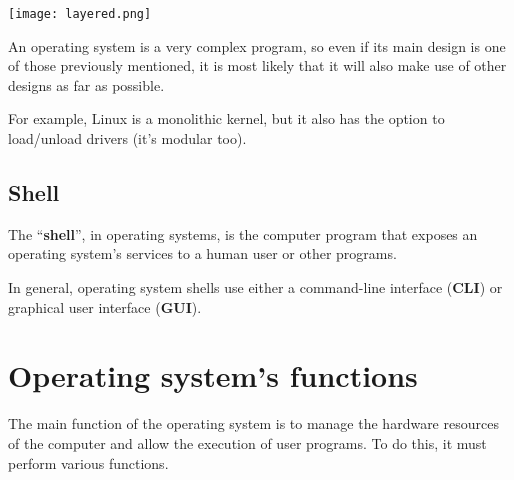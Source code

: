 \begin{itemize}
    \begin{center}
        \texttt{[image: layered.png]}
    \end{center}
\end{itemize}

An operating system is a very complex program, so even if its main design is one of those previously mentioned, it is most likely that it will also make use of other designs as far as possible.

For example, Linux is a monolithic kernel, but it also has the option to load/unload drivers (it's modular too).


\subsection{Shell}
The “\textbf{shell}”, in operating systems, is the computer program that exposes an operating system's services to a human user or other programs.

In general, operating system shells use either a command-line interface (\textbf{CLI}) or graphical user interface (\textbf{GUI}).





\section{Operating system's functions}
The main function of the operating system is to manage the hardware resources of the computer and allow the execution of user programs. To do this, it must perform various functions.

